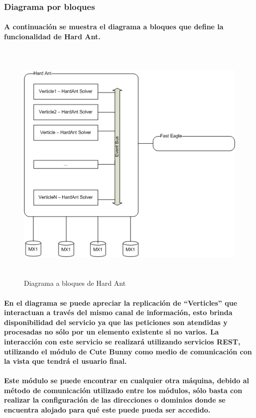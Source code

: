         \begin{landscape}
          \subsubsection{Diagrama por bloques}
          \paragraph{A continuación se muestra el diagrama a bloques que define la funcionalidad de Hard Ant.}
          \begin{figure}[b!]
          \centering
          \includegraphics[width=17.5cm,height=12cm]{./images/DiagramaHardAnt.png}
          \caption{Diagrama a bloques de Hard Ant}
        \end{figure}
        \end{landscape}
      \newpage
    \paragraph{En el diagrama se puede apreciar la replicación de ``Verticles'' que interactuan a través del mismo canal de información, esto brinda disponibilidad del servicio ya que las peticiones son atendidas y procesadas no sólo por un elemento existente si no varios. La interacción con este servicio se realizará utilizando servicios REST, utilizando el módulo de Cute Bunny como medio de comunicación con la vista que tendrá el usuario final.}
    \paragraph{Este módulo se puede encontrar en cualquier otra máquina, debido al método de comunicación utilizado entre los módulos, sólo basta con realizar la configuración de las direcciones o dominios donde se encuentra alojado para qué este puede pueda ser accedido.}